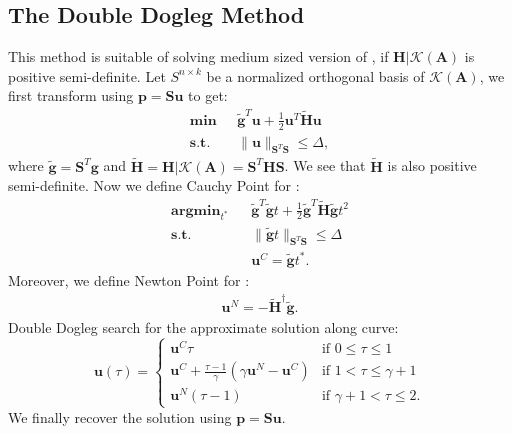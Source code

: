 \documentclass[annual]{acmsiggraph}
\newcommand{\E}[1]{\mathbf{#1}}
\begin{document}
\subsection{The Double Dogleg Method}
This method is suitable of solving medium sized version of , if $\E{H}|\mathcal{K}(\E{A})$ is positive semi-definite. Let $S^{n\times k}$ be a normalized orthogonal basis of $\mathcal{K}(\E{A})$, we first transform  using $\E{p}=\E{S}\E{u}$ to get:
\begin{subequations}
\label{pb:TR_PROB_R}
\begin{align}
\E{min}\text{ }&\tilde{\E{g}}^T\E{u}+\frac{1}{2}\E{u}^T\tilde{\E{H}}\E{u}	\\
\E{s.t.}\text{ }&\|\E{u}\|_{\E{S}^T\E{S}}\leq\Delta,
\end{align}
\end{subequations}
where $\tilde{\E{g}}=\E{S}^T\E{g}$ and $\tilde{\E{H}}=\E{H}|\mathcal{K}(\E{A})=\E{S}^T\E{H}\E{S}$. We see that $\tilde{\E{H}}$ is also positive semi-definite. Now we define Cauchy Point for :
\begin{eqnarray*}
\E{argmin}_{t^*}&&\tilde{\E{g}}^T\tilde{\E{g}}t+\frac{1}{2}\tilde{\E{g}}^T\tilde{\E{H}}\tilde{\E{g}}t^2	\\
\E{s.t.}&&\|\tilde{\E{g}}t\|_{\E{S}^T\E{S}}\leq\Delta	\\
&&\E{u}^C=\tilde{\E{g}}t^*.
\end{eqnarray*}
Moreover, we define Newton Point for :
\begin{eqnarray*}
\E{u}^N=-\tilde{\E{H}}^\dagger\tilde{\E{g}}.
\end{eqnarray*}
Double Dogleg search for the approximate solution along curve:
\begin{equation*}
\E{u}(\tau)=
\begin{cases}
   \E{u}^C\tau & \text{if } 0 \leq \tau \leq 1 \\
   \E{u}^C+\frac{\tau-1}{\gamma}(\gamma\E{u}^N-\E{u}^C) & \text{if } 1 < \tau \leq \gamma+1	\\
   \E{u}^N(\tau-1) & \text{if } \gamma+1 < \tau \leq 2.
\end{cases}
\end{equation*}
We finally recover the solution using $\E{p}=\E{S}\E{u}$. 
\end{document}
